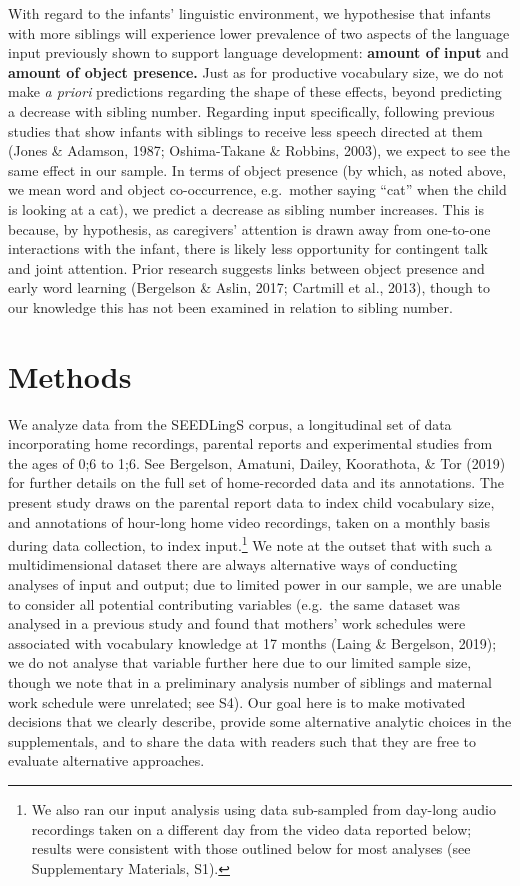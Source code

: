 \documentclass[
  man,mask,floatsintext]{apa6}
\begin{document}
With regard to the infants' linguistic environment, we hypothesise that infants with more siblings will experience lower prevalence of two aspects of the language input previously shown to support language development: \textbf{amount of input} and \textbf{amount of object presence.} Just as for productive vocabulary size, we do not make \emph{a priori} predictions regarding the shape of these effects, beyond predicting a decrease with sibling number. Regarding input specifically, following previous studies that show infants with siblings to receive less speech directed at them (Jones \& Adamson, 1987; Oshima-Takane \& Robbins, 2003), we expect to see the same effect in our sample. In terms of object presence (by which, as noted above, we mean word and object co-occurrence, e.g.~mother saying ``cat'' when the child is looking at a cat), we predict a decrease as sibling number increases. This is because, by hypothesis, as caregivers' attention is drawn away from one-to-one interactions with the infant, there is likely less opportunity for contingent talk and joint attention. Prior research suggests links between object presence and early word learning (Bergelson \& Aslin, 2017; Cartmill et al., 2013), though to our knowledge this has not been examined in relation to sibling number.

\hypertarget{methods}{%
\section{Methods}\label{methods}}

We analyze data from the SEEDLingS corpus, a longitudinal set of data incorporating home recordings, parental reports and experimental studies from the ages of 0;6 to 1;6. See Bergelson, Amatuni, Dailey, Koorathota, \& Tor (2019) for further details on the full set of home-recorded data and its annotations. The present study draws on the parental report data to index child vocabulary size, and annotations of hour-long home video recordings, taken on a monthly basis during data collection, to index input.\footnote{We also ran our input analysis using data sub-sampled from day-long audio recordings taken on a different day from the video data reported below; results were consistent with those outlined below for most analyses (see Supplementary Materials, S1).} We note at the outset that with such a multidimensional dataset there are always alternative ways of conducting analyses of input and output; due to limited power in our sample, we are unable to consider all potential contributing variables (e.g.~the same dataset was analysed in a previous study and found that mothers' work schedules were associated with vocabulary knowledge at 17 months (Laing \& Bergelson, 2019); we do not analyse that variable further here due to our limited sample size, though we note that in a preliminary analysis number of siblings and maternal work schedule were unrelated; see S4). Our goal here is to make motivated decisions that we clearly describe, provide some alternative analytic choices in the supplementals, and to share the data with readers such that they are free to evaluate alternative approaches.
\end{document}
